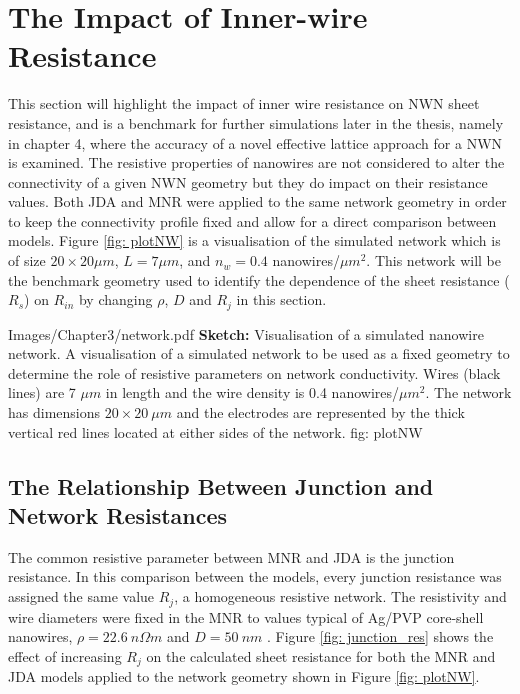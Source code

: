 \section{The Impact of Inner-wire Resistance}
\label{Sec: Resistive properties}
This section will highlight the impact of inner wire resistance on NWN sheet resistance, and is a benchmark for further simulations later in the thesis, namely in chapter 4, where the accuracy of a novel effective lattice approach for a NWN is examined. The resistive properties of nanowires are not considered to alter the connectivity of a given NWN geometry but they do impact on their resistance values. Both JDA and MNR were applied to the same network geometry in order to keep the connectivity profile fixed and allow for a direct comparison between models. Figure \ref{fig: plotNW} is a visualisation of the simulated network which is of size $20 \times 20 \mu m$, $L=7\mu m$, and $n_w = 0.4$ nanowires/$\mu m^{2}$. This network will be the benchmark geometry used to identify the dependence of the sheet resistance ($R_s$) on $R_{in}$ by changing $\rho$, $D$ and $R_j$ in this section.

{Images/Chapter3/network.pdf}
{\textbf{Sketch:} Visualisation of a simulated nanowire network.}
{A visualisation of a simulated network to be used as a fixed geometry to determine the role of resistive parameters on network conductivity. Wires (black lines) are 7 $\mu m$ in length and the wire density is 0.4 nanowires/$\mu m^{2}$. The network has dimensions $20 \times 20 ~ \mu m$ and the electrodes are represented by the thick vertical red lines located at either sides of the network.}
{fig: plotNW}
\subsection{The Relationship Between Junction and Network Resistances}
The common resistive parameter between MNR and JDA is the junction resistance. In this comparison between the models, every junction resistance was assigned the same value $R_j$, a homogeneous resistive network. The resistivity and wire diameters were fixed in the MNR to values typical of Ag/PVP core-shell nanowires, $\rho = 22.6 ~ n \Omega m$ and $D = 50 ~ nm$ \cite{rocha2015}. Figure \ref{fig: junction_res} shows the effect of increasing $R_j$ on the calculated sheet resistance for both the MNR and JDA models applied to the network geometry shown in Figure \ref{fig: plotNW}. 

